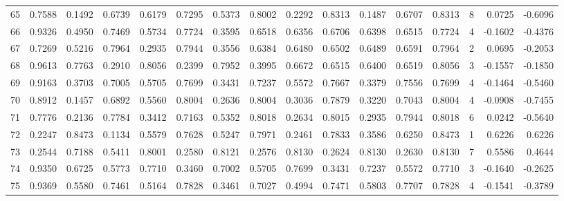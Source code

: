 \begin{tabular}{lrrrrrrrrrrrrrrr}
65  &      0.7588 &  0.1492 &  0.6739 &  0.6179 &  0.7295 &  0.5373 &  0.8002 &  0.2292 &  0.8313 &  0.1487 &   0.6707 &     0.8313 &      8 &                    0.0725 &                    -0.6096 \\
66  &      0.9326 &  0.4950 &  0.7469 &  0.5734 &  0.7724 &  0.3595 &  0.6518 &  0.6356 &  0.6706 &  0.6398 &   0.6515 &     0.7724 &      4 &                   -0.1602 &                    -0.4376 \\
67  &      0.7269 &  0.5216 &  0.7964 &  0.2935 &  0.7944 &  0.3556 &  0.6384 &  0.6480 &  0.6502 &  0.6489 &   0.6591 &     0.7964 &      2 &                    0.0695 &                    -0.2053 \\
68  &      0.9613 &  0.7763 &  0.2910 &  0.8056 &  0.2399 &  0.7952 &  0.3995 &  0.6672 &  0.6515 &  0.6400 &   0.6519 &     0.8056 &      3 &                   -0.1557 &                    -0.1850 \\
69  &      0.9163 &  0.3703 &  0.7005 &  0.5705 &  0.7699 &  0.3431 &  0.7237 &  0.5572 &  0.7667 &  0.3379 &   0.7556 &     0.7699 &      4 &                   -0.1464 &                    -0.5460 \\
70  &      0.8912 &  0.1457 &  0.6892 &  0.5560 &  0.8004 &  0.2636 &  0.8004 &  0.3036 &  0.7879 &  0.3220 &   0.7043 &     0.8004 &      4 &                   -0.0908 &                    -0.7455 \\
71  &      0.7776 &  0.2136 &  0.7784 &  0.3412 &  0.7163 &  0.5352 &  0.8018 &  0.2634 &  0.8015 &  0.2935 &   0.7944 &     0.8018 &      6 &                    0.0242 &                    -0.5640 \\
72  &      0.2247 &  0.8473 &  0.1134 &  0.5579 &  0.7628 &  0.5247 &  0.7971 &  0.2461 &  0.7833 &  0.3586 &   0.6250 &     0.8473 &      1 &                    0.6226 &                     0.6226 \\
73  &      0.2544 &  0.7188 &  0.5411 &  0.8001 &  0.2580 &  0.8121 &  0.2576 &  0.8130 &  0.2624 &  0.8130 &   0.2630 &     0.8130 &      7 &                    0.5586 &                     0.4644 \\
74  &      0.9350 &  0.6725 &  0.5773 &  0.7710 &  0.3460 &  0.7002 &  0.5705 &  0.7699 &  0.3431 &  0.7237 &   0.5572 &     0.7710 &      3 &                   -0.1640 &                    -0.2625 \\
75  &      0.9369 &  0.5580 &  0.7461 &  0.5164 &  0.7828 &  0.3461 &  0.7027 &  0.4994 &  0.7471 &  0.5803 &   0.7707 &     0.7828 &      4 &                   -0.1541 &                    -0.3789 \\

\end{tabular}
